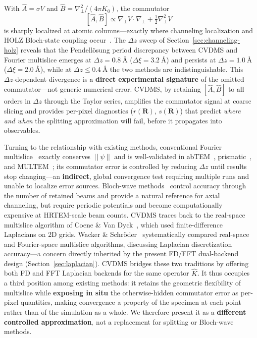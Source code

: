 \documentclass[twoside,11pt]{article}
\begin{document}
With $\hat A=\sigma V$ and $\hat B=\nabla_\perp^2/(4\pi K_0)$, the commutator
\begin{equation}\label{eq:commutator}
[\hat A,\hat B]\propto\nabla_\perp V\!\cdot\!\nabla_\perp+\tfrac12\nabla_\perp^2 V
\end{equation}
is sharply localized at atomic columns---exactly where channeling localization and HOLZ Bloch-state coupling occur~\cite{ChenVanDyck1997,PennycookNellist2011}. The $\Delta z$ sweep of Section~\ref{sec:channeling-holz} reveals that the Pendell\"osung period discrepancy between CVDMS and Fourier multislice emerges at $\Delta z=\SI{0.8}{\angstrom}$ ($\Delta\xi=\SI{3.2}{\angstrom}$) and persists at $\Delta z=\SI{1.0}{\angstrom}$ ($\Delta\xi=\SI{2.0}{\angstrom}$), while at $\Delta z\le\SI{0.4}{\angstrom}$ the two methods are indistinguishable. This $\Delta z$-dependent divergence is a \textbf{direct experimental signature} of the omitted commutator---not generic numerical error. CVDMS, by retaining $[\hat A,\hat B]$ to all orders in $\Delta z$ through the Taylor series, amplifies the commutator signal at coarse slicing and provides per-pixel diagnostics ($r(\mathbf{R})$, $s(\mathbf{R})$) that predict \textit{where and when} the splitting approximation will fail, before it propagates into observables.

Turning to the relationship with existing methods, conventional Fourier multislice~\cite{Kirkland2020,CowleyMoodie1957,MadsenSusi2021} exactly conserves $\|\psi\|$ and is well-validated in abTEM~\cite{MadsenSusi2021}, prismatic~\cite{Ophus2017}, and MULTEM~\cite{LobatoVanDyck2015}; its commutator error is controlled by reducing $\Delta z$ until results stop changing---an \textbf{indirect}, global convergence test requiring multiple runs and unable to localize error sources. Bloch-wave methods~\cite{Kirkland2020} control accuracy through the number of retained beams and provide a natural reference for axial channeling, but require periodic potentials and become computationally expensive at HRTEM-scale beam counts. CVDMS traces back to the real-space multislice algorithm of Coene \& Van Dyck~\cite{CoeneVanDyck1984}, which used finite-difference Laplacians on 2D grids. Wacker \& Schr\"oder~\cite{WackerSchroder2015} systematically compared real-space and Fourier-space multislice algorithms, discussing Laplacian discretization accuracy---a concern directly inherited by the present FD/FFT dual-backend design (Section~\ref{sec:laplacian}). CVDMS bridges these two traditions by offering both FD and FFT Laplacian backends for the same operator $\hat{K}$. It thus occupies a third position among existing methods: it retains the geometric flexibility of multislice while \textbf{exposing in situ} the otherwise-hidden commutator error as per-pixel quantities, making convergence a property of the specimen at each point rather than of the simulation as a whole. We therefore present it as a \textbf{different controlled approximation}, not a replacement for splitting or Bloch-wave methods.
\end{document}
